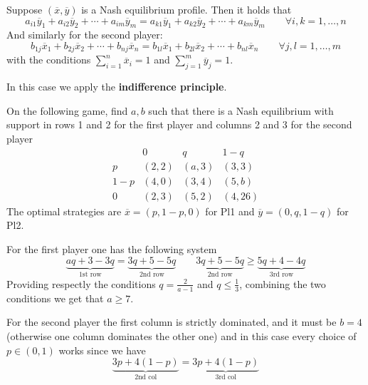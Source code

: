 \documentclass[../main.tex]{subfiles}
\begin{document}
Suppose $(\overline{x}, \overline{y})$ is a Nash equilibrium profile. Then it holds that
\[
    a_{i1}\overline{y}_1 + a_{i2}\overline{y}_2 + \cdots + a_{im}\overline{y}_m = a_{k1}\overline{y}_1 + a_{k2}\overline{y}_2 + \cdots + a_{km}\overline{y}_m \qquad \forall i,k = 1, \ldots, n
\]
And similarly for the second player:
\[
    b_{1j}\overline{x}_1 + b_{2j}\overline{x}_2 + \cdots + b_{nj}\overline{x}_n = b_{1l}\overline{x}_1 + b_{2l}\overline{x}_2 + \cdots + b_{nl}\overline{x}_n \qquad \forall j,l = 1, \ldots, m
\]
with the conditions $\sum_{i=1}^n \overline{x}_i = 1$ and $\sum_{j=1}^m \overline{y}_j = 1$.

In this case we apply the \textbf{indifference principle}.
\begin{example}
    On the following game, find $a,b$ such that there is a Nash equilibrium with support in rows 1 and 2 for the first player and columns 2 and 3 for the second player
    \[
        \begin{array}{cccc}
                & 0     & q     & 1-q    \\
            p   & (2,2) & (a,3) & (3,3)  \\
            1-p & (4,0) & (3,4) & (5,b)  \\
            0   & (2,3) & (5,2) & (4,26)
        \end{array}
    \]
    The optimal strategies are $\overline{x} = (p,1-p,0)$ for Pl1 and $\overline{y} = (0,q,1-q)$ for Pl2.

    For the first player one has the following system
    \[
        \underbrace{aq + 3-3q}_{\text{1st row}} = \underbrace{3q + 5 -5q}_{\text{2nd row}} \qquad \underbrace{3q + 5-5q}_{\text{2nd row}} \geq \underbrace{5q +4 -4q}_{\text{3rd row}}
    \]
    Providing respectly the conditions $q = \frac{2}{a-1}$ and $q \leq \frac{1}{3}$, combining the two conditions we get that $a \geq 7$.

    For the second player the first column is strictly dominated, and it must be $b = 4$ (otherwise one column dominates the other one) and in this case every choice of $p \in (0,1)$ works since we have
    \[
        \underbrace{3p+4(1-p)}_{\text{2nd col}} = \underbrace{3p+4(1-p)}_{\text{3rd col}}
    \]
\end{example}
\end{document}
